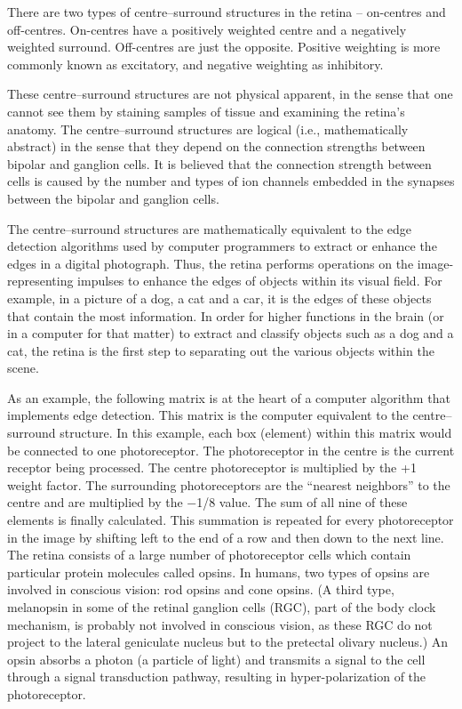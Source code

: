 \documentclass[]{book}
\begin{document}
There are two types of centre--surround structures in the retina -- on-centres and off-centres. On-centres have a positively weighted centre and a negatively weighted surround. Off-centres are just the opposite. Positive weighting is more commonly known as excitatory, and negative weighting as inhibitory.

These centre--surround structures are not physical apparent, in the sense that one cannot see them by staining samples of tissue and examining the retina's anatomy. The centre--surround structures are logical (i.e., mathematically abstract) in the sense that they depend on the connection strengths between bipolar and ganglion cells. It is believed that the connection strength between cells is caused by the number and types of ion channels embedded in the synapses between the bipolar and ganglion cells.

The centre--surround structures are mathematically equivalent to the edge detection algorithms used by computer programmers to extract or enhance the edges in a digital photograph. Thus, the retina performs operations on the image-representing impulses to enhance the edges of objects within its visual field. For example, in a picture of a dog, a cat and a car, it is the edges of these objects that contain the most information. In order for higher functions in the brain (or in a computer for that matter) to extract and classify objects such as a dog and a cat, the retina is the first step to separating out the various objects within the scene.

As an example, the following matrix is at the heart of a computer algorithm that implements edge detection. This matrix is the computer equivalent to the centre--surround structure. In this example, each box (element) within this matrix would be connected to one photoreceptor. The photoreceptor in the centre is the current receptor being processed. The centre photoreceptor is multiplied by the +1 weight factor. The surrounding photoreceptors are the ``nearest neighbors'' to the centre and are multiplied by the −1/8 value. The sum of all nine of these elements is finally calculated. This summation is repeated for every photoreceptor in the image by shifting left to the end of a row and then down to the next line.
The retina consists of a large number of photoreceptor cells which contain particular protein molecules called opsins. In humans, two types of opsins are involved in conscious vision: rod opsins and cone opsins. (A third type, melanopsin in some of the retinal ganglion cells (RGC), part of the body clock mechanism, is probably not involved in conscious vision, as these RGC do not project to the lateral geniculate nucleus but to the pretectal olivary nucleus.) An opsin absorbs a photon (a particle of light) and transmits a signal to the cell through a signal transduction pathway, resulting in hyper-polarization of the photoreceptor.
\end{document}
